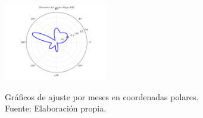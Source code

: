\begin{figure}[ht!]
\begin{center}
{            \includegraphics[width=0.4\textwidth]{figures/direction_mayo_2015.png}
        }\\
    \end{center}
    \caption{Gráficos de ajuste por meses en coordenadas polares.\\ Fuente: Elaboración propia.}
    \label{fig:PLOT_MONTHS_1}
\end{figure}

